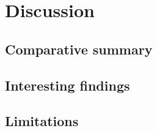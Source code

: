 \section{Discussion}
\lipsum[40]
\subsection{Comparative summary}
\subsection{Interesting findings}
\subsection{Limitations}